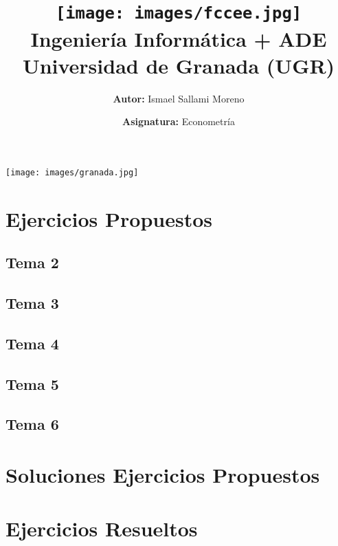 \documentclass[a4paper,12pt]{article}
\title{
    \vspace{-2cm}
    \texttt{[image: images/fccee.jpg]} \\ %
    \LARGE Ingeniería Informática + ADE\\
    \large Universidad de Granada (UGR)\\[1cm]
}
\author{\textbf{Autor:} Ismael Sallami Moreno}
\date{\textbf{Asignatura:} Econometría}
\begin{document}
\maketitle
\thispagestyle{empty}

\begin{center}
    \texttt{[image: images/granada.jpg]} \\ %
    \vfill
\end{center}

\newpage

\tableofcontents
\newpage

\section{Ejercicios Propuestos}
\subsection{Tema 2}

\subsection{Tema 3}

\subsection{Tema 4}

\subsection{Tema 5}

\subsection{Tema 6}


\section{Soluciones Ejercicios Propuestos}


\section{Ejercicios Resueltos}
\end{document}
